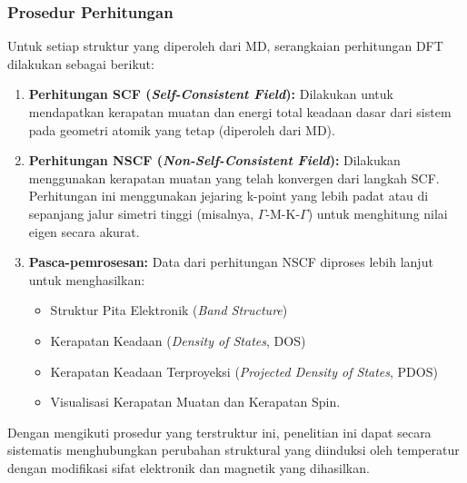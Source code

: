 \subsubsection{Prosedur Perhitungan}
Untuk setiap struktur yang diperoleh dari MD, serangkaian perhitungan DFT dilakukan sebagai berikut:
\begin{enumerate}
    \item \textbf{Perhitungan SCF (\textit{Self-Consistent Field}):} Dilakukan untuk mendapatkan kerapatan muatan dan energi total keadaan dasar dari sistem pada geometri atomik yang tetap (diperoleh dari MD).
    \item \textbf{Perhitungan NSCF (\textit{Non-Self-Consistent Field}):} Dilakukan menggunakan kerapatan muatan yang telah konvergen dari langkah SCF. Perhitungan ini menggunakan jejaring k-point yang lebih padat atau di sepanjang jalur simetri tinggi (misalnya, $\Gamma$-M-K-$\Gamma$) untuk menghitung nilai eigen secara akurat.
    \item \textbf{Pasca-pemrosesan:} Data dari perhitungan NSCF diproses lebih lanjut untuk menghasilkan:
    \begin{itemize}
        \item Struktur Pita Elektronik (\textit{Band Structure})
        \item Kerapatan Keadaan (\textit{Density of States}, DOS)
        \item Kerapatan Keadaan Terproyeksi (\textit{Projected Density of States}, PDOS)
        \item Visualisasi Kerapatan Muatan dan Kerapatan Spin.
    \end{itemize}
\end{enumerate}
Dengan mengikuti prosedur yang terstruktur ini, penelitian ini dapat secara sistematis menghubungkan perubahan struktural yang diinduksi oleh temperatur dengan modifikasi sifat elektronik dan magnetik yang dihasilkan.